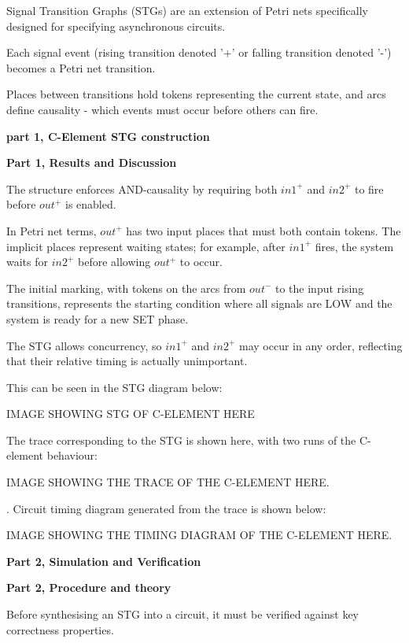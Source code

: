 \documentclass[a4paper,12pt]{article}
\begin{document}
Signal Transition Graphs (STGs) are an extension of Petri nets specifically designed for specifying asynchronous circuits. 

Each signal event (rising transition denoted '+' or falling transition denoted '-') becomes a Petri net transition. 

Places between transitions hold tokens representing the current state, and arcs define causality - which events must occur before others can fire.

\textbf{part 1, C-Element STG construction}

\textbf{Part 1, Results and Discussion}

The structure enforces AND-causality by requiring both $in1^+$ and $in2^+$ to fire before $out^+$ is enabled. 

In Petri net terms, $out^+$ has two input places that must both contain tokens. The implicit places represent waiting states; for example, after $in1^+$ fires, the system waits for $in2^+$ before allowing $out^+$ to occur. 

The initial marking, with tokens on the arcs from $out^-$ to the input rising transitions, represents the starting condition where all signals are LOW and the system is ready for a new SET phase. 

The STG allows concurrency, so $in1^+$ and $in2^+$ may occur in any order, reflecting that their relative timing is actually unimportant.

This can be seen in the STG diagram below:

\begin{large}
    IMAGE SHOWING STG OF C-ELEMENT HERE
\end{large}

The trace corresponding to the STG is shown here, with two runs of the C-element behaviour:

\begin{large}
 IMAGE SHOWING THE TRACE OF THE C-ELEMENT HERE.
\end{large}

 . Circuit timing diagram generated from the trace is shown below:

\begin{large}
    IMAGE SHOWING THE TIMING DIAGRAM OF THE C-ELEMENT HERE.
\end{large}

\textbf{Part 2, Simulation and Verification}

\textbf{Part 2, Procedure and theory}

Before synthesising an STG into a circuit, it must be verified against key correctness properties. 
\end{document}
